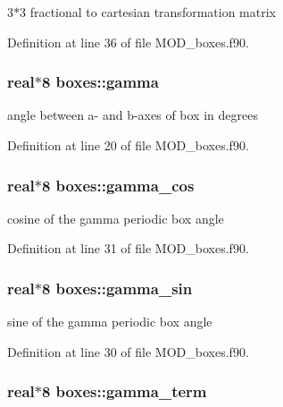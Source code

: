 3$\ast$3 fractional to cartesian transformation matrix 



Definition at line 36 of file M\-O\-D\-\_\-boxes.\-f90.

\hypertarget{classboxes_a2b56941f0a6ab84834791d9db89af298}{
\subsubsection[{gamma}]{\setlength{\rightskip}{0pt plus 5cm}real$\ast$8 boxes\-::gamma}}\label{classboxes_a2b56941f0a6ab84834791d9db89af298}


angle between a-\/ and b-\/axes of box in degrees 



Definition at line 20 of file M\-O\-D\-\_\-boxes.\-f90.

\hypertarget{classboxes_ad5eefe83d23d93b1de5e4370bda74194}{
\subsubsection[{gamma\-\_\-cos}]{\setlength{\rightskip}{0pt plus 5cm}real$\ast$8 boxes\-::gamma\-\_\-cos}}\label{classboxes_ad5eefe83d23d93b1de5e4370bda74194}


cosine of the gamma periodic box angle 



Definition at line 31 of file M\-O\-D\-\_\-boxes.\-f90.

\hypertarget{classboxes_a789f912c3cff1d590a6a9aa6a3073080}{
\subsubsection[{gamma\-\_\-sin}]{\setlength{\rightskip}{0pt plus 5cm}real$\ast$8 boxes\-::gamma\-\_\-sin}}\label{classboxes_a789f912c3cff1d590a6a9aa6a3073080}


sine of the gamma periodic box angle 



Definition at line 30 of file M\-O\-D\-\_\-boxes.\-f90.

\hypertarget{classboxes_ac208c73a5a2e30d60bd4707832bf360a}{
\subsubsection[{gamma\-\_\-term}]{\setlength{\rightskip}{0pt plus 5cm}real$\ast$8 boxes\-::gamma\-\_\-term}}\label{classboxes_ac208c73a5a2e30d60bd4707832bf360a}


